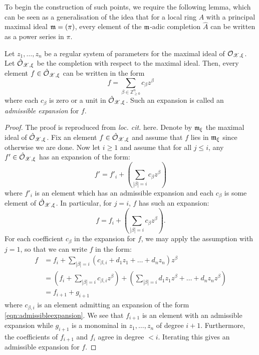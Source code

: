 To begin the construction of such points, we require the following lemma, which can be seen as a generalisation of the idea that for a local ring $A$ with a principal maximal ideal $\mathfrak{m} = (\pi)$, every element of the $\mathfrak{m}$-adic completion $\hat{A}$ can be written as a power series in $\pi$.

\begin{lemma}\parencite[Lemma 2.4.4]{MN}
    Let $z_1, \dots, z_n$ be a regular system of parameters for the maximal ideal of $\mathcal{O}_{\mathscr{X}, \xi}$. 
    Let $\hat{\mathcal{O}}_{\mathscr{X}, \xi}$ be the completion with respect to the maximal ideal. 
    Then, every element $f \in \hat{\mathcal{O}}_{\mathscr{X}, \xi}$ can be written in the form
    \begin{equation}\label{eqn:admissibleexpansion}
        f = \sum_{\beta \in \mathbb{Z}^n_{\geq 0}} c_{\beta} z^{\beta}
    \end{equation}
    where each $c_{\beta}$ is zero or a unit in $\hat{\mathcal{O}}_{\mathscr{X}, \xi}$.
    Such an expansion is called an \textit{admissible expansion} for $f$.
\end{lemma}
\begin{proof}
    The proof is reproduced from \textit{loc. cit.} here.
    Denote by $\mathfrak{m}_{\xi}$ the maximal ideal of $\hat{\mathcal{O}}_{\mathscr{X}, \xi}$.
    Fix an element $f \in \hat{\mathcal{O}}_{\mathscr{X}, \xi}$ and assume that $f$ lies in $\mathfrak{m}_{\xi}$ since otherwise we are done. 
    Now let $i \geq 1$ and assume that for all $j \leq i$, any $f' \in \hat{\mathcal{O}}_{\mathscr{X}, \xi}$ has an expansion of the form:
    \[
        f' = f'_i + \left( \sum_{|\beta| = i} c_\beta z^{\beta} \right)
    \]
    where $f'_i$ is an element which has an admissible expansion and each $c_\beta$ is some element of $\hat{\mathcal{O}}_{\mathscr{X}, \xi}$. 
    In particular, for $j = i$, $f$ has such an expansion:
    \[
        f = f_i + \left( \sum_{|\beta| = i} c_\beta z^{\beta} \right).
    \]
    For each coefficient $c_\beta$ in the expansion for $f$, we may apply the assumption with $j = 1$, so that we can write $f$ in the form:
    \begin{align*}
        f & = f_{i} + \sum_{|\beta| = i} (c_{\beta, i} + d_{1} z_1 + \dots + d_n z_n) z^{\beta} \\
        & = \left(f_i + \sum_{|\beta| = i} c_{\beta, i} z^{\beta}\right) + \left(\sum_{|\beta| = i} d_1 z_1 z^{\beta} + \dots + d_n z_n z^{\beta}\right) \\
        & = f_{i + 1} + g_{i + 1}
    \end{align*}
    where $c_{\beta, i}$ is an element admitting an expansion of the form \ref{eqn:admissibleexpansion}.
    We see that $f_{i + 1}$ is an element with an admissible expansion while $g_{i + 1}$ is a monominal in $z_1, \dots, z_n$ of degree $i + 1$.
    Furthermore, the coefficients of $f_{i + 1}$ and $f_{i}$ agree in degree $ < i$.
    Iterating this gives an admissible expansion for $f$.
\end{proof}

